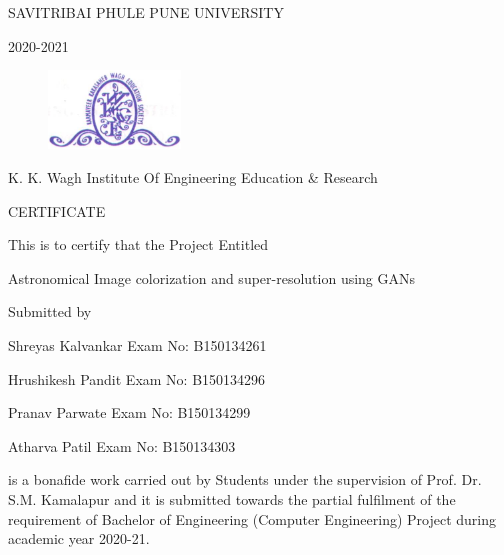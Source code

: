 \documentclass[oneside,a4paper,12pt]{report}
\begin{document}
\newpage



{\bfseries \fontsize{12}{12} \selectfont \centerline{SAVITRIBAI PHULE PUNE UNIVERSITY }
}

{\bfseries \fontsize{12}{12} \selectfont \centerline{2020-2021}
\vspace*{1\baselineskip}}

\begin{figure}[ht]
\centering
\includegraphics[width=100pt]{collegelogo.png}
\end{figure}

{\bfseries \fontsize{14}{12} \selectfont \centerline{K. K. Wagh Institute Of Engineering Education \& Research}
\vspace*{1\baselineskip}} 


{\bfseries \fontsize{14}{12} \selectfont \centerline{CERTIFICATE} 
} 

\centerline{This is to certify that the Project Entitled}
\vspace*{1\baselineskip} 


{\bfseries \fontsize{14}{12} \selectfont \centerline{Astronomical Image colorization and super-resolution using GANs}
\vspace*{1\baselineskip}}

\centerline{Submitted by}
\vspace*{1\baselineskip}
\centerline{Shreyas Kalvankar  \hspace{25 mm} Exam No: B150134261}
\centerline{Hrushikesh Pandit \hspace{27 mm} Exam No: B150134296 }
\centerline{Pranav Parwate \hspace{31 mm} Exam No: B150134299}
\centerline{Atharva Patil \hspace{35 mm} Exam No: B150134303}
\vspace*{1\baselineskip}
is a bonafide work carried out by Students under the supervision of Prof. Dr. S.M. Kamalapur and it is submitted towards the partial fulfilment of the requirement of Bachelor of Engineering (Computer Engineering) Project during academic year 2020-21.\\
\end{document}
